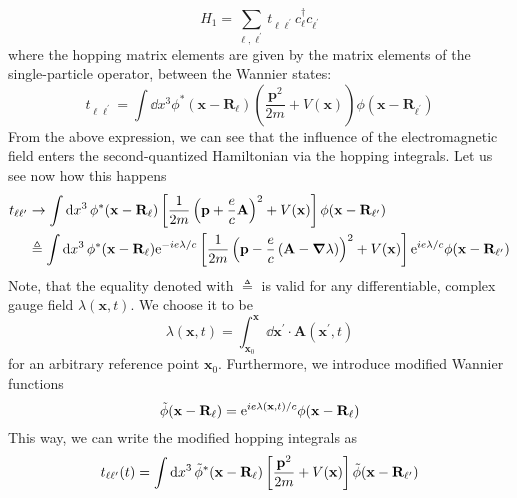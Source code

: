 \begin{equation}
    H_{1} = \sum_{\ell,\ell^{\prime} } t_{\ell\ell^{\prime}} c^{\dag}_{\ell}c_{\ell^{\prime}}
\end{equation}
where the hopping matrix elements are given by the matrix elements of the single-particle operator,
between the Wannier states:
\begin{equation}
    t_{\ell\ell^{\prime}} = \int \dd{x^3} \phi^{*}(\mathbf{x} - \mathbf{R}_{\ell})
    \left(\frac{\mathbf{p}^{2}}{2m} + V(\mathbf{x} )\right)\phi(\mathbf{x} - \mathbf{R}_{\ell^{\prime}})
\end{equation}
From the above expression, we can see that the influence of the electromagnetic field enters the second-quantized
Hamiltonian via the hopping integrals. Let us see now how this happens
\begin{align}
    t_{\ell\ell^{\prime}} & \to \int \dd{x^3} \phi^{*}(\mathbf{x} - \mathbf{R}_{\ell})
    \left[\frac{1}{2m}\left( \mathbf{p} + \frac{e}{c} \mathbf{A}  \right)^2  + V(\mathbf{x} )\right]
    \phi(\mathbf{x} - \mathbf{R}_{\ell^{\prime}}) \nonumber                                                                 \\
                          & \triangleq \int \dd{x^3} \phi^{*}(\mathbf{x} - \mathbf{R}_{\ell}) \mathrm{e}^{-i e \lambda / c}
    \left[\frac{1}{2m}\left( \mathbf{p} - \frac{e}{c} \left( \mathbf{A} - \grad{\lambda } \right)   \right)^2  + V(\mathbf{x} )\right]
    \mathrm{e}^{i e \lambda / c} \phi(\mathbf{x} - \mathbf{R}_{\ell^{\prime}})
\end{align}
Note, that the equality denoted with \(\triangleq \) is valid for any differentiable, complex gauge field \(\lambda (\mathbf{x},t)\).
We choose it to be
\begin{equation}
    \lambda (\mathbf{x},t) =  \int_{\mathbf{x}_0 }^{\mathbf{x}} \dd{\mathbf{x}^{\prime}} \cdot \mathbf{A}(\mathbf{x}^{\prime},t)
\end{equation}
for an arbitrary reference point \(\mathbf{x}_0 \). Furthermore, we introduce modified Wannier functions
\begin{equation}
    \Tilde{\phi}(\mathbf{x} - \mathbf{R}_{\ell}) = \mathrm{e}^{i e \lambda(\mathbf{x} ,t) / c} \phi(\mathbf{x} - \mathbf{R}_{\ell})
\end{equation}
This way, we can write the modified hopping integrals as
\begin{equation}
    {t}_{\ell\ell^{\prime}}(t) = \int \dd{x^3} \Tilde{\phi}^{*}(\mathbf{x} - \mathbf{R}_{\ell})
    \left[\frac{\mathbf{p}^2}{2m}  + V(\mathbf{x} )\right]
    \Tilde{\phi}(\mathbf{x} - \mathbf{R}_{\ell^{\prime}})
\end{equation}
